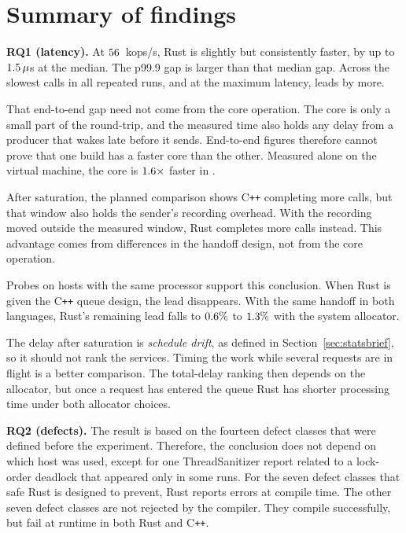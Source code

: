\documentclass[english,oneside,a4paper,censored,csm,software-track-2020]{HYthesisML}
\begin{document}
\section{Summary of findings}
\begin{compactitem}
\item \textbf{RQ1 (latency).} At $56$~kops/s, Rust is slightly but consistently faster,
by up to $1.5\,\mu$s at the median. The p99.9 gap is larger than that median gap.
Across the slowest calls in all repeated runs, and at the maximum latency, \FarTailLower{} leads by more.

That end-to-end gap need not come from the core operation. 
The core is only a small part of the round-trip, and the measured time 
also holds any delay from a producer that wakes late before it sends. 
End-to-end figures therefore cannot prove that one build has a faster core than the other.
Measured alone on the virtual machine, the core is $1.6\times$ faster in \BudgetCoreFaster{}.

After saturation, the planned comparison shows C\texttt{++} completing more calls, 
but that window also holds the sender's recording overhead. With the recording moved 
outside the measured window, Rust completes more calls instead. This advantage comes 
from differences in the handoff design, not from the core operation.

Probes on hosts with the same processor support this conclusion. 
When Rust is given the C\texttt{++} queue design, the lead disappears. 
With the same handoff in both languages, Rust's remaining lead falls 
to $0.6\%$ to $1.3\%$ with the system allocator.

The delay after saturation is \emph{schedule drift}, as defined in Section~\ref{sec:statsbrief}, 
so it should not rank the services. 
Timing the work while several requests are in flight is a better comparison. 
The total-delay ranking then depends on the allocator, but once a request has entered the 
queue Rust has shorter processing time under both allocator choices.

\item \textbf{RQ2 (defects).} The result is based on the fourteen defect classes that were
defined before the experiment. Therefore, the conclusion does not depend on which host was
used, except for one ThreadSanitizer report related to a lock-order deadlock that appeared
only in some runs. For the seven defect classes that safe Rust is designed to prevent, Rust
reports errors at compile time. The other seven defect classes are not rejected by the
compiler. They compile successfully, but fail at runtime in both Rust and C\texttt{++}.


\end{compactitem}
\end{document}
